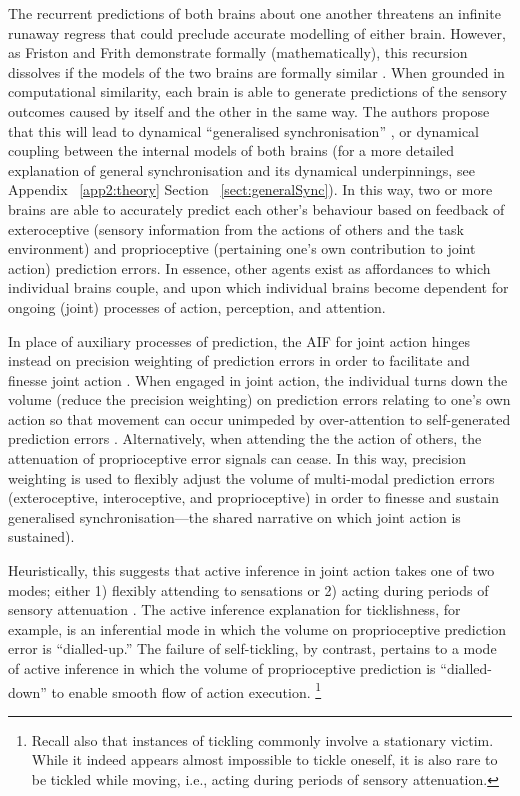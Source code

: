 \begin{CJK}{UTF8}{gbsn}
The recurrent predictions of both brains about one another threatens an infinite runaway regress that could preclude accurate modelling of either brain.  However, as Friston and Frith demonstrate formally (mathematically), this recursion dissolves if the models of the two brains are formally similar \citep{Friston2015}.  When grounded in computational similarity, each brain is able to generate predictions of the sensory outcomes caused by itself and the other in the same way.  The authors propose that this will lead to dynamical ``generalised synchronisation'' \citep{Barreto2003}, or dynamical coupling between the internal models of both brains (for a more detailed explanation of general synchronisation and its dynamical underpinnings, see Appendix ~\ref{app2:theory} Section ~\ref{sect:generalSync}).  In this way, two or more brains are able to accurately predict each other's behaviour based on feedback of exteroceptive (sensory information from the actions of others and the task environment) and proprioceptive (pertaining one's own contribution to joint action) prediction errors.  In essence, other agents exist as affordances to which individual brains couple, and upon which individual brains become dependent for ongoing (joint) processes of action, perception, and attention.

In place of auxiliary processes of prediction, the AIF for joint action hinges instead on precision weighting of prediction errors in order to facilitate and finesse joint action \citep{Friston2015}.    When engaged in joint action, the individual turns down the volume (reduce the precision weighting) on prediction errors relating to one's own action so that movement can occur unimpeded by over-attention to self-generated prediction errors \citep[an intuitive example of the opposite of this ideal scenario is a Skype call in which the flow of an individual's speech is interrupted by auditory feedback from the other receiver's device (feedback that would otherwise be attenuated by the speaker), see][]{Friston2015}.  Alternatively, when attending the the action of others, the attenuation of proprioceptive error signals can cease. In this way, precision weighting is used to flexibly adjust the volume of multi-modal prediction errors (exteroceptive, interoceptive, and proprioceptive) in order to finesse and sustain generalised synchronisation---the shared narrative on which joint action is sustained).

Heuristically, this suggests that active inference in joint action takes one of two modes; either 1) flexibly attending to sensations or
2) acting during periods of sensory attenuation \citep{Friston2015}.  The active inference explanation for ticklishness, for example, is an inferential mode in which the volume on proprioceptive prediction error is ``dialled-up.''  The failure of self-tickling, by contrast, pertains to a mode of active inference in which the volume of proprioceptive prediction is ``dialled-down'' to enable smooth flow of action execution.
  \footnote{Recall also that instances of tickling commonly involve a stationary victim. While it indeed appears almost impossible to tickle oneself, it is also rare to be tickled while moving, i.e., acting during periods of sensory attenuation.}



\end{CJK}
